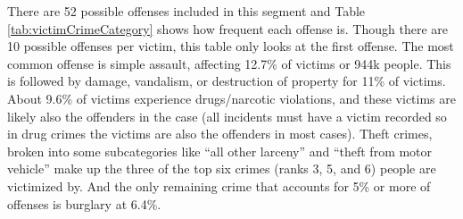 \documentclass[
]{krantz}
\begin{document}
There are 52 possible offenses included in this segment and
Table \ref{tab:victimCrimeCategory} shows how frequent each
offense is. Though there are 10 possible offenses per
victim, this table only looks at the first offense. The most
common offense is simple assault, affecting 12.7\% of
victims or 944k people. This is followed by damage,
vandalism, or destruction of property for 11\% of victims.
About 9.6\% of victims experience drugs/narcotic violations,
and these victims are likely also the offenders in the case
(all incidents must have a victim recorded so in drug crimes
the victims are also the offenders in most cases). Theft
crimes, broken into some subcategories like ``all other
larceny'' and ``theft from motor vehicle'' make up the three
of the top six crimes (ranks 3, 5, and 6) people are
victimized by. And the only remaining crime that accounts
for 5\% or more of offenses is burglary at 6.4\%.
\end{document}
